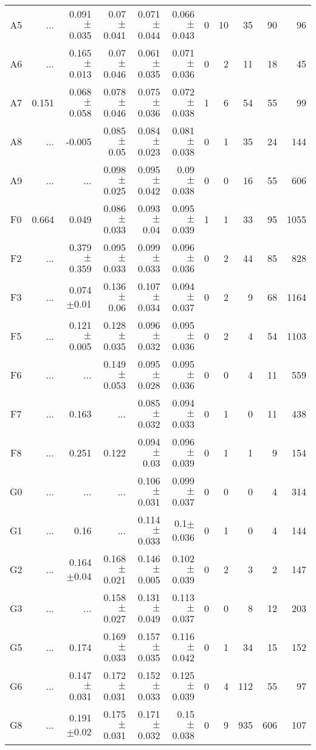 \begin{table}[t]
\begin{center}
\begin{tabular}{c|rrrrr|rrrrr}
A5	&	 ...	&	0.091$\pm$0.035	&	0.07$\pm$0.041	&	0.071$\pm$0.044	&	0.066$\pm$0.043	&	0	&	10	&	35	&	90	&	96	\\
A6	&	 ...	&	0.165$\pm$0.013	&	0.07$\pm$0.046	&	0.061$\pm$0.035	&	0.071$\pm$0.036	&	0	&	2	&	11	&	18	&	45	\\
A7	&	0.151	&	0.068$\pm$0.058	&	0.078$\pm$0.046	&	0.075$\pm$0.036	&	0.072$\pm$0.038	&	1	&	6	&	54	&	55	&	99	\\
A8	&	 ...	&	-0.005	&	0.085$\pm$0.05	&	0.084$\pm$0.023	&	0.081$\pm$0.038	&	0	&	1	&	35	&	24	&	144	\\
A9	&	 ...	&	 ...	&	0.098$\pm$0.025	&	0.095$\pm$0.042	&	0.09$\pm$0.038	&	0	&	0	&	16	&	55	&	606	\\
F0	&	0.664	&	0.049	&	0.086$\pm$0.033	&	0.093$\pm$0.04	&	0.095$\pm$0.039	&	1	&	1	&	33	&	95	&	1055	\\
F2	&	 ...	&	0.379$\pm$0.359	&	0.095$\pm$0.033	&	0.099$\pm$0.033	&	0.096$\pm$0.036	&	0	&	2	&	44	&	85	&	828	\\
F3	&	 ...	&	0.074$\pm$0.01	&	0.136$\pm$0.06	&	0.107$\pm$0.034	&	0.094$\pm$0.037	&	0	&	2	&	9	&	68	&	1164	\\
F5	&	 ...	&	0.121$\pm$0.005	&	0.128$\pm$0.035	&	0.096$\pm$0.032	&	0.095$\pm$0.036	&	0	&	2	&	4	&	54	&	1103	\\
F6	&	 ...	&	 ...	&	0.149$\pm$0.053	&	0.095$\pm$0.028	&	0.095$\pm$0.036	&	0	&	0	&	4	&	11	&	559	\\
F7	&	 ...	&	0.163	&	 ...	&	0.085$\pm$0.032	&	0.094$\pm$0.033	&	0	&	1	&	0	&	11	&	438	\\
F8	&	 ...	&	0.251	&	0.122	&	0.094$\pm$0.03	&	0.096$\pm$0.039	&	0	&	1	&	1	&	9	&	154	\\
G0	&	 ...	&	 ...	&	 ...	&	0.106$\pm$0.031	&	0.099$\pm$0.037	&	0	&	0	&	0	&	4	&	314	\\
G1	&	 ...	&	0.16	&	 ...	&	0.114$\pm$0.033	&	0.1$\pm$0.036	&	0	&	1	&	0	&	4	&	144	\\
G2	&	 ...	&	0.164$\pm$0.04	&	0.168$\pm$0.021	&	0.146$\pm$0.005	&	0.102$\pm$0.039	&	0	&	2	&	3	&	2	&	147	\\
G3	&	 ...	&	 ...	&	0.158$\pm$0.027	&	0.131$\pm$0.049	&	0.113$\pm$0.037	&	0	&	0	&	8	&	12	&	203	\\
G5	&	 ...	&	0.174	&	0.169$\pm$0.033	&	0.157$\pm$0.035	&	0.116$\pm$0.042	&	0	&	1	&	34	&	15	&	152	\\
G6	&	 ...	&	0.147$\pm$0.031	&	0.172$\pm$0.031	&	0.152$\pm$0.033	&	0.125$\pm$0.039	&	0	&	4	&	112	&	55	&	97	\\
G8	&	 ...	&	0.191$\pm$0.02	&	0.175$\pm$0.031	&	0.171$\pm$0.032	&	0.15$\pm$0.038	&	0	&	9	&	935	&	606	&	107	\\

\end{tabular}
\end{center}
\end{table}
